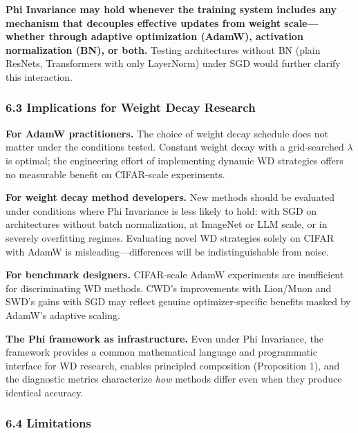 \documentclass[
]{article}
\begin{document}
\textbf{Phi Invariance may hold whenever the training system includes
any mechanism that decouples effective updates from weight
scale---whether through adaptive optimization (AdamW), activation
normalization (BN), or both.} Testing architectures without BN (plain
ResNets, Transformers with only LayerNorm) under SGD would further
clarify this interaction.

\hypertarget{implications-for-weight-decay-research}{%
\subsubsection{6.3 Implications for Weight Decay
Research}\label{implications-for-weight-decay-research}}

\textbf{For AdamW practitioners.} The choice of weight decay schedule
does not matter under the conditions tested. Constant weight decay with
a grid-searched \(\lambda\) is optimal; the engineering effort of
implementing dynamic WD strategies offers no measurable benefit on
CIFAR-scale experiments.

\textbf{For weight decay method developers.} New methods should be
evaluated under conditions where Phi Invariance is less likely to hold:
with SGD on architectures without batch normalization, at ImageNet or
LLM scale, or in severely overfitting regimes. Evaluating novel WD
strategies solely on CIFAR with AdamW is misleading---differences will
be indistinguishable from noise.

\textbf{For benchmark designers.} CIFAR-scale AdamW experiments are
insufficient for discriminating WD methods. CWD's improvements with
Lion/Muon and SWD's gains with SGD may reflect genuine
optimizer-specific benefits masked by AdamW's adaptive scaling.

\textbf{The Phi framework as infrastructure.} Even under Phi Invariance,
the framework provides a common mathematical language and programmatic
interface for WD research, enables principled composition (Proposition
1), and the diagnostic metrics characterize \emph{how} methods differ
even when they produce identical accuracy.

\hypertarget{limitations}{%
\subsubsection{6.4 Limitations}\label{limitations}}
\end{document}
